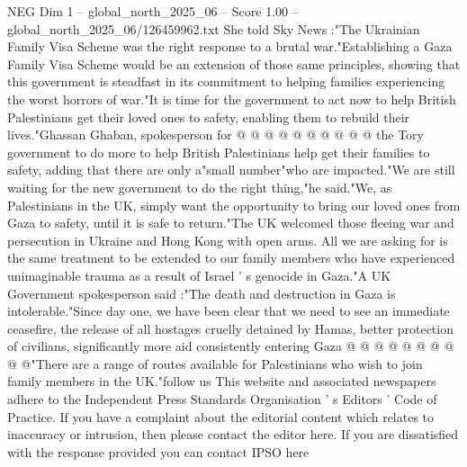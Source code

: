 \begin{textsample}{NEG Dim 1 – global\_north\_2025\_06 – Score 1.00 – global\_north\_2025\_06/126459962.txt}
She told Sky News :"The Ukrainian Family Visa Scheme was the right response to a brutal war."Establishing a Gaza Family Visa Scheme would be an extension of those same principles, showing that this government is steadfast in its commitment to helping families experiencing the worst horrors of war."It is time for the government to act now to help British Palestinians get their loved ones to safety, enabling them to rebuild their lives."Ghassan Ghaban, spokesperson for @ @ @ @ @ @ @ @ @ @ the Tory government to do more to help British Palestinians help get their families to safety, adding that there are only a"small number"who are impacted."We are still waiting for the new government to do the right thing,"he said."We, as Palestinians in the UK, simply want the opportunity to bring our loved ones from Gaza to safety, until it is safe to return."The UK welcomed those fleeing war and persecution in Ukraine and Hong Kong with open arms.
All we are asking for is the same treatment to be extended to our family members who have experienced unimaginable trauma as a result of Israel ' s genocide in Gaza."A UK Government spokesperson said :"The death and destruction in Gaza is intolerable."Since day one, we have been clear that we need to see an immediate ceasefire, the release of all hostages cruelly detained by Hamas, better protection of civilians, significantly more aid consistently entering Gaza @ @ @ @ @ @ @ @ @ @"There are a range of routes available for Palestinians who wish to join family members in the UK."follow us This website and associated newspapers adhere to the Independent Press Standards Organisation ' s Editors ' Code of Practice.
If you have a complaint about the editorial content which relates to inaccuracy or intrusion, then please contact the editor here.
If you are dissatisfied with the response provided you can contact IPSO here

\end{textsample}
